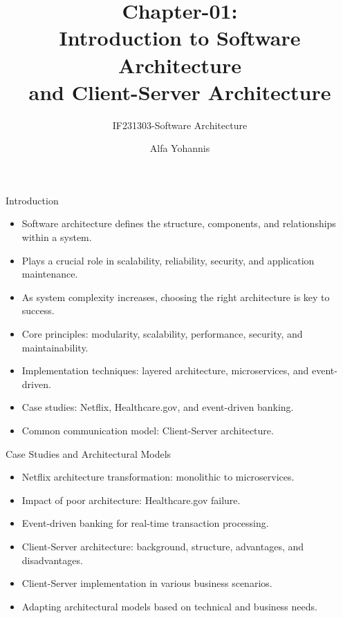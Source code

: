 \documentclass[aspectratio=169, table]{beamer}
\title{Chapter-01:\\Introduction to Software Architecture\\and Client-Server Architecture}
\subtitle{IF231303-Software Architecture}
\author{Alfa Yohannis}
\begin{document}
	
	\begin{frame}[plain]
		\maketitle
	\end{frame}
	
	
	\begin{frame}{Introduction}
		\begin{itemize}
			\item Software architecture defines the structure, components, and relationships within a system.
			\item Plays a crucial role in scalability, reliability, security, and application maintenance.
			\item As system complexity increases, choosing the right architecture is key to success.
			\item Core principles: modularity, scalability, performance, security, and maintainability.
			\item Implementation techniques: layered architecture, microservices, and event-driven.
			\item Case studies: Netflix, Healthcare.gov, and event-driven banking.
			\item Common communication model: Client-Server architecture.
		\end{itemize}
	\end{frame}
	
	\begin{frame}{Case Studies and Architectural Models}
		\begin{itemize}
			\item Netflix architecture transformation: monolithic to microservices.
			\item Impact of poor architecture: Healthcare.gov failure.
			\item Event-driven banking for real-time transaction processing.
			\item Client-Server architecture: background, structure, advantages, and disadvantages.
			\item Client-Server implementation in various business scenarios.
			\item Adapting architectural models based on technical and business needs.
		\end{itemize}
	\end{frame}
	
\end{document}
